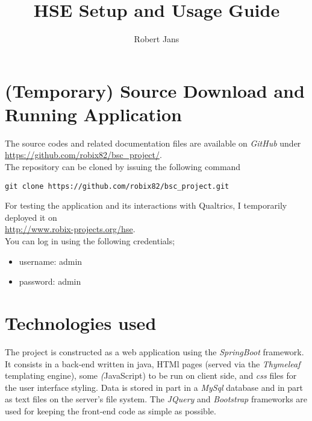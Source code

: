 \documentclass[fleqn]{article}
\title{HSE Setup and Usage Guide}
\author{Robert Jans}
\begin{document}
\setlength{\parindent}{0cm}

\maketitle

\newpage

\tableofcontents

\newpage

\section{(Temporary) Source Download and Running Application}

The source codes and related documentation files are available on \emph{GitHub} under \\

\href{https://github.com/robix82/bsc_project/}{https://github.com/robix82/bsc\_project/}. \\

The repository can be cloned by issuing the following command 
\begin{verbatim}
git clone https://github.com/robix82/bsc_project.git
\end{verbatim}

For testing the application and its interactions with Qualtrics, I temporarily deployed it on \\

\url{http://www.robix-projects.org/hse}. \\


You can log in using the following credentials;

\begin{itemize}
\item username: admin
\item password: admin
\end{itemize}

\section{Technologies used}

The project is constructed as a web application using the \emph{SpringBoot} framework. It consists in 
a back-end written in java, HTMl pages (served via the \emph{Thymeleaf} templating engine), some
\emph(JavaScript) to be run on client side, and \emph{css} files for the user interface styling. 
Data is stored in part in a \emph{MySql} database and in part as text files
on the server's file system. The \emph{JQuery} and \emph{Bootstrap} frameworks are used for keeping the
front-end code as simple as possible.
\end{document}

